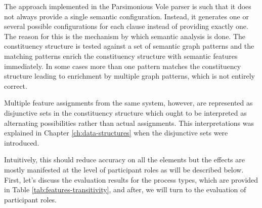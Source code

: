     The approach implemented in the Parsimonious Vole parser is such that it does not always provide a single semantic configuration. Instead, it generates one or several possible configurations for each clause instead of providing exactly one. The reason for this is the mechanism by which semantic analysis is done. The constituency structure is tested against a set of semantic graph patterns and the matching patterns enrich the constituency structure with semantic features immediately. In some cases more than one pattern matches the constituency structure leading to enrichment by multiple graph patterns, which is not entirely correct. 
    
    Multiple feature assignments from the same system, however, are represented as disjunctive sets in the constituency structure which ought to be interpreted as alternating possibilities rather than actual assignments. This interpretations was explained in Chapter \ref{ch:data-structures} when the disjunctive sets were introduced.
    
    Intuitively, this should reduce accuracy on all the elements but the effects are mostly manifested at the level of participant roles as will be described below. First, let's discuss the evaluation results for the process types, which are provided in Table \ref{tab:features-transitivity}, and after, we will turn to the evaluation of participant roles.
    
